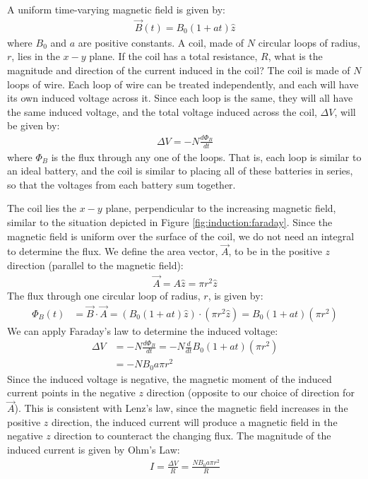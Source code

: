 \begin{example}{\label{ex:induction:changingB}A uniform time-varying magnetic field is given by:
\begin{align*}
\vec B(t) = B_0(1+at)\hat z
\end{align*}
where $B_0$ and $a$ are positive constants. A coil, made of $N$ circular loops of radius, $r$, lies in the $x-y$ plane. If the coil has a total resistance, $R$, what is the magnitude and direction of the current induced in the coil?}
The coil is made of $N$ loops of wire. Each loop of wire can be treated independently, and each will have its own induced voltage across it. Since each loop is the same, they will all have the same induced voltage, and the total voltage induced across the coil, $\Delta V$, will be given by:
\begin{align*}
\Delta V = -N \frac{d\Phi_B}{dt}
\end{align*}
where $\Phi_B$ is the flux through any one of the loops. That is, each loop is similar to an ideal battery, and the coil is similar to placing all of these batteries in series, so that the voltages from each battery sum together.

The coil lies the $x-y$ plane, perpendicular to the increasing magnetic field, similar to the situation depicted in Figure \ref{fig:induction:faraday}. Since the magnetic field is uniform over the surface of the coil, we do not need an integral to determine the flux. We define the area vector, $\vec A$, to be in the positive $z$ direction (parallel to the magnetic field):
\begin{align*}
\vec A = A \hat z = \pi r^2 \hat z
\end{align*}
The flux through one circular loop of radius, $r$, is given by:
\begin{align*}
\Phi_B (t) &= \vec B \cdot \vec A = ( B_0(1+at)\hat z) \cdot (\pi r^2 \hat z) =B_0(1+at) (\pi r^2)
\end{align*}
We can apply Faraday's law to determine the induced voltage:
\begin{align*}
\Delta V &= -N \frac{d\Phi_B}{dt} = -N \frac{d}{dt} B_0(1+at) (\pi r^2)\\
&=-NB_0a\pi r^2
\end{align*}
Since the induced voltage is negative, the magnetic moment of the induced current points in the negative $z$ direction (opposite to our choice of direction for $\vec A$). This is consistent with Lenz's law, since the magnetic field increases in the positive $z$ direction, the induced current will produce a magnetic field in the negative $z$ direction to counteract the changing flux. The magnitude of the induced current is given by Ohm's Law:
\begin{align*}
I = \frac{\Delta V}{R}=\frac{NB_0a\pi r^2}{R}
\end{align*}


\end{example}
